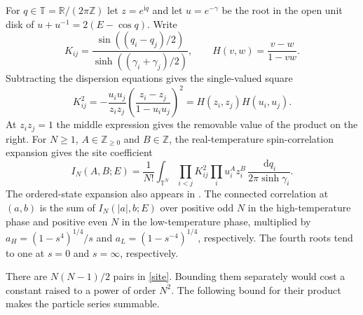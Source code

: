 \documentclass[11pt]{article}
\newcommand{\ii}{\mathrm i}
\newcommand{\dd}{\,\mathrm d}
\newcommand{\R}{\mathbb R}
\newcommand{\Z}{\mathbb Z}
\newcommand{\T}{\mathbb T}
\begin{document}
For $q\in\T=\R/(2\pi\Z)$ let $z=e^{\ii q}$ and let $u=e^{-\gamma}$
be the root in the open unit disk of $u+u^{-1}=2(E-\cos q)$.
Write
\[
 K_{ij}=\frac{\sin((q_i-q_j)/2)}{\sinh((\gamma_i+\gamma_j)/2)},
 \qquad H(v,w)=\frac{v-w}{1-vw}.
\]
Subtracting the dispersion equations gives the single-valued square
\begin{equation}\label{pair}
 K_{ij}^2=-\frac{u_i u_j}{z_i z_j}
          \left(\frac{z_i-z_j}{1-u_i u_j}\right)^2
          = H(z_i,z_j)H(u_i,u_j).
\end{equation}
At $z_i z_j=1$ the middle expression gives the removable value of the product on the right.
For $N\ge1$, $A\in\Z_{\ge0}$ and $B\in\Z$, the real-temperature
spin-correlation expansion \cite[(3.13), (3.17)--(3.20), (4.1)--(4.2)]{ONGP}
gives the site coefficient
\begin{equation}\label{site}
 I_N(A,B;E)=\frac1{N!}\int_{\T^N}\prod_{i<j}K_{ij}^2
       \prod_i u_i^A z_i^B\,\frac{\dd q_i}{2\pi\sinh\gamma_i}.
\end{equation}
The ordered-state expansion also appears in \cite[Theorem~5.0]{PT}.
The connected correlation at $(a,b)$ is the sum of
$I_N(|a|,b;E)$ over positive odd $N$ in the high-temperature phase
and positive even $N$ in the low-temperature phase, multiplied by
$a_H=(1-s^4)^{1/4}/s$ and $a_L=(1-s^{-4})^{1/4}$, respectively.
The fourth roots tend to one at $s=0$ and $s=\infty$, respectively.

There are $N(N-1)/2$ pairs in \eqref{site}. Bounding them separately
would cost a constant raised to a power of order $N^2$. The following
bound for their product makes the particle series summable.
\end{document}
